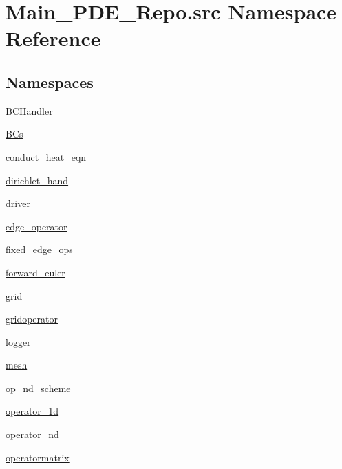 \hypertarget{namespaceMain__PDE__Repo_1_1src}{}\section{Main\+\_\+\+P\+D\+E\+\_\+\+Repo.\+src Namespace Reference}
\label{namespaceMain__PDE__Repo_1_1src}
\subsection*{Namespaces}
\begin{DoxyCompactItemize}
\item 
 \hyperlink{namespaceMain__PDE__Repo_1_1src_1_1BCHandler}{B\+C\+Handler}
\item 
 \hyperlink{namespaceMain__PDE__Repo_1_1src_1_1BCs}{B\+Cs}
\item 
 \hyperlink{namespaceMain__PDE__Repo_1_1src_1_1conduct__heat__eqn}{conduct\+\_\+heat\+\_\+eqn}
\item 
 \hyperlink{namespaceMain__PDE__Repo_1_1src_1_1dirichlet__hand}{dirichlet\+\_\+hand}
\item 
 \hyperlink{namespaceMain__PDE__Repo_1_1src_1_1driver}{driver}
\item 
 \hyperlink{namespaceMain__PDE__Repo_1_1src_1_1edge__operator}{edge\+\_\+operator}
\item 
 \hyperlink{namespaceMain__PDE__Repo_1_1src_1_1fixed__edge__ops}{fixed\+\_\+edge\+\_\+ops}
\item 
 \hyperlink{namespaceMain__PDE__Repo_1_1src_1_1forward__euler}{forward\+\_\+euler}
\item 
 \hyperlink{namespaceMain__PDE__Repo_1_1src_1_1grid}{grid}
\item 
 \hyperlink{namespaceMain__PDE__Repo_1_1src_1_1gridoperator}{gridoperator}
\item 
 \hyperlink{namespaceMain__PDE__Repo_1_1src_1_1logger}{logger}
\item 
 \hyperlink{namespaceMain__PDE__Repo_1_1src_1_1mesh}{mesh}
\item 
 \hyperlink{namespaceMain__PDE__Repo_1_1src_1_1op__nd__scheme}{op\+\_\+nd\+\_\+scheme}
\item 
 \hyperlink{namespaceMain__PDE__Repo_1_1src_1_1operator__1d}{operator\+\_\+1d}
\item 
 \hyperlink{namespaceMain__PDE__Repo_1_1src_1_1operator__nd}{operator\+\_\+nd}
\item 
 \hyperlink{namespaceMain__PDE__Repo_1_1src_1_1operatormatrix}{operatormatrix}

\end{DoxyCompactItemize}
